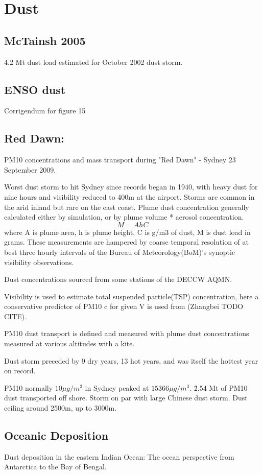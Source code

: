 \section{Dust}

\subsection{McTainsh 2005}
4.2 Mt dust load estimated for October 2002 dust storm.

\subsection{ENSO dust \cite{Rotstayn_2011}}
Corrigendum for figure 15

\subsection{Red Dawn: \cite{Leys_2011}}
PM10 concentrations and mass transport during "Red Dawn" - Sydney 23 September 2009.

Worst dust storm to hit Sydney since records began in 1940, with heavy dust for nine hours and visibility reduced to 400m at the airport.
Storms are common in the arid inland but rare on the east coast.
Plume dust concentration generally calculated either by simulation, or by plume volume * aerosol concentration.
$$M = AhC$$ 
where A is plume area, h is plume height, C is g/m3 of dust, M is dust load in grams.
These measurements are hampered by coarse temporal resolution of at best three hourly intervals of the Bureau of Meteorology(BoM)'s synoptic visibility observations.

Dust concentrations sourced from some stations of the DECCW AQMN.

Visibility is used to estimate total suspended particle(TSP) concentration, here a conservative predictor of PM10 c for given V is used from (Zhangbei TODO CITE).

PM10 dust transport is defined and measured with plume dust concentrations measured at various altitudes with a kite. 

Dust storm preceded by 9 dry years, 13 hot years, and was itself the hottest year on record.

PM10 normally $10{\mu}g/m^3$ in Sydney peaked at $15366{\mu}g/m^3$.
\~2.54 Mt of PM10 dust transported off shore.
Storm on par with large Chinese dust storm.
Dust ceiling around 2500m, up to 3000m.


\subsection{Oceanic Deposition \cite{Grand_2015}}
Dust deposition in the eastern Indian Ocean: The ocean perspective from Antarctica to the Bay of Bengal.

